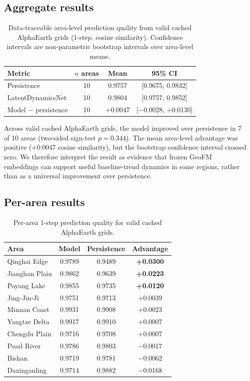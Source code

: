 \documentclass{article}
\begin{document}
\subsection{Aggregate results}

\begin{table}[htbp]
\centering
\caption{Data-traceable area-level prediction quality from valid cached AlphaEarth grids (1-step, cosine similarity). Confidence intervals are non-parametric bootstrap intervals over area-level means.}
\label{tab:aggregate}
\begin{tabular}{lccc}
\toprule
Metric & $n$ areas & Mean & 95\% CI \\
\midrule
Persistence & 10 & 0.9757 & [0.9675, 0.9832] \\
LatentDynamicsNet & 10 & 0.9804 & [0.9757, 0.9852] \\
Model $-$ persistence & 10 & +0.0047 & [$-$0.0028, +0.0130] \\
\bottomrule
\end{tabular}
\end{table}

Across valid cached AlphaEarth grids, the model improved over persistence in 7 of 10 areas (two-sided sign-test $p=0.344$). The mean area-level advantage was positive (+0.0047 cosine similarity), but the bootstrap confidence interval crossed zero. We therefore interpret the result as evidence that frozen GeoFM embeddings can support useful baseline-trend dynamics in some regions, rather than as a universal improvement over persistence.

\subsection{Per-area results}

\begin{table}[htbp]
\centering
\caption{Per-area 1-step prediction quality for valid cached AlphaEarth grids.}
\label{tab:perarea}
\begin{tabular}{lccc}
\toprule
Area & Model & Persistence & Advantage \\
\midrule
Qinghai Edge & 0.9789 & 0.9489 & \textbf{+0.0300} \\
Jianghan Plain & 0.9862 & 0.9639 & \textbf{+0.0223} \\
Poyang Lake & 0.9855 & 0.9735 & \textbf{+0.0120} \\
Jing-Jin-Ji & 0.9751 & 0.9713 & +0.0039 \\
Minnan Coast & 0.9931 & 0.9908 & +0.0023 \\
Yangtze Delta & 0.9917 & 0.9910 & +0.0007 \\
Chengdu Plain & 0.9716 & 0.9708 & +0.0007 \\
Pearl River & 0.9786 & 0.9803 & $-$0.0017 \\
Bishan & 0.9719 & 0.9781 & $-$0.0062 \\
Daxinganling & 0.9714 & 0.9882 & $-$0.0168 \\
\bottomrule
\end{tabular}
\end{table}
\end{document}
